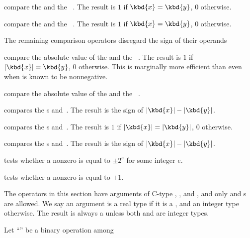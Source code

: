  compare the   and
the ~. The result is $1$ if $\kbd{x} = \kbd{y}$, $0$ otherwise.


 compare the   and
the ~. The result is $1$ if $\kbd{x} = \kbd{y}$, $0$
otherwise.


The remaining comparison operators disregard the sign of their operands

 compare the absolute value of the
  and the ~. The result is $1$ if
$|\kbd{x}| = \kbd{y}$, $0$ otherwise. This is marginally more efficient
than  even when  is known to be nonnegative.


 compare the absolute value of the
  and the ~.



 compares the s  and~.
The result is the sign of $|\kbd{x}| - |\kbd{y}|$.

 compares the s 
and~. The result is $1$ if $|\kbd{x}| = |\kbd{y}|$, $0$ otherwise.

 compares the s  and~.
The result is the sign of $|\kbd{x}| - |\kbd{y}|$.

 tests whether a nonzero  
is equal to $\pm 2^e$ for some integer $e$.

 tests whether a nonzero  
is equal to $\pm 1$.

\label{se:genbinop} The operators in this
section have arguments of C-type , , and , and
only  and  s are allowed. We say an argument is a
real type if it is a  , and an integer type otherwise. The
result is always a  unless both  and  are integer
types.

Let ``\op'' be a binary operation among

